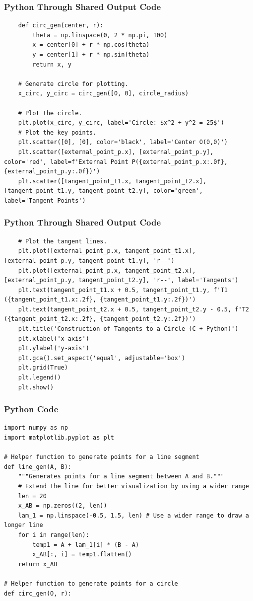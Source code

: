 \documentclass{beamer}
\begin{document}
\begin{frame}[fragile]
\frametitle{Python Through Shared Output Code}
\begin{lstlisting}
    def circ_gen(center, r):
        theta = np.linspace(0, 2 * np.pi, 100)
        x = center[0] + r * np.cos(theta)
        y = center[1] + r * np.sin(theta)
        return x, y

    # Generate circle for plotting.
    x_circ, y_circ = circ_gen([0, 0], circle_radius)

    # Plot the circle.
    plt.plot(x_circ, y_circ, label='Circle: $x^2 + y^2 = 25$')
    # Plot the key points.
    plt.scatter([0], [0], color='black', label='Center O(0,0)')
    plt.scatter([external_point_p.x], [external_point_p.y], color='red', label=f'External Point P({external_point_p.x:.0f}, {external_point_p.y:.0f})')
    plt.scatter([tangent_point_t1.x, tangent_point_t2.x], [tangent_point_t1.y, tangent_point_t2.y], color='green', label='Tangent Points')
\end{lstlisting}
\end{frame}
\begin{frame}[fragile]
\frametitle{Python Through Shared Output Code}
\begin{lstlisting}
    # Plot the tangent lines.
    plt.plot([external_point_p.x, tangent_point_t1.x], [external_point_p.y, tangent_point_t1.y], 'r--')
    plt.plot([external_point_p.x, tangent_point_t2.x], [external_point_p.y, tangent_point_t2.y], 'r--', label='Tangents')
    plt.text(tangent_point_t1.x + 0.5, tangent_point_t1.y, f'T1 ({tangent_point_t1.x:.2f}, {tangent_point_t1.y:.2f})')
    plt.text(tangent_point_t2.x + 0.5, tangent_point_t2.y - 0.5, f'T2 ({tangent_point_t2.x:.2f}, {tangent_point_t2.y:.2f})')
    plt.title('Construction of Tangents to a Circle (C + Python)')
    plt.xlabel('x-axis')
    plt.ylabel('y-axis')
    plt.gca().set_aspect('equal', adjustable='box')
    plt.grid(True)
    plt.legend()
    plt.show()
\end{lstlisting}
\end{frame}
\begin{frame}[fragile]
\frametitle{Python Code}
\begin{lstlisting}
import numpy as np
import matplotlib.pyplot as plt

# Helper function to generate points for a line segment
def line_gen(A, B):
    """Generates points for a line segment between A and B."""
    # Extend the line for better visualization by using a wider range
    len = 20
    x_AB = np.zeros((2, len))
    lam_1 = np.linspace(-0.5, 1.5, len) # Use a wider range to draw a longer line
    for i in range(len):
        temp1 = A + lam_1[i] * (B - A)
        x_AB[:, i] = temp1.flatten()
    return x_AB

# Helper function to generate points for a circle
def circ_gen(O, r):
\end{lstlisting}
\end{frame}
\end{document}
